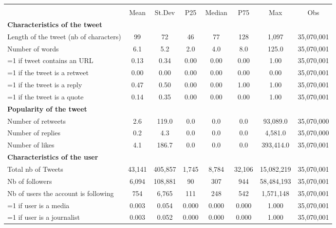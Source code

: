 {
\def\sym#1{\ifmmode^{#1}\else\(^{#1}\)\fi}
\begin{tabular}{l*{1}{ccccccc}}
\hline\hline
                    &\multicolumn{7}{c}{}                                                                      \\
                    &        Mean&      St.Dev&         P25&      Median&         P75&         Max&         Obs\\
\hline
\textbf{Characteristics of the tweet}&            &            &            &            &            &            &            \\
Length of the tweet (nb of characters)&          99&          72&          46&          77&         128&       1,097&  35,070,001\\
Number of words     &         6.1&         5.2&         2.0&         4.0&         8.0&       125.0&  35,070,001\\
=1 if tweet contains an URL&        0.13&        0.34&        0.00&        0.00&        0.00&        1.00&  35,070,001\\
=1 if the tweet is a retweet&        0.00&        0.00&        0.00&        0.00&        0.00&        0.00&  35,070,001\\
=1 if the tweet is a reply&        0.47&        0.50&        0.00&        0.00&        1.00&        1.00&  35,070,001\\
=1 if the tweet is a quote&        0.14&        0.35&        0.00&        0.00&        0.00&        1.00&  35,070,001\\
\textbf{Popularity of the tweet}&            &            &            &            &            &            &            \\
Number of retweets  &         2.6&       119.0&         0.0&         0.0&         0.0&    93,089.0&  35,070,000\\
Number of replies   &         0.2&         4.3&         0.0&         0.0&         0.0&     4,581.0&  35,070,000\\
Number of likes     &         4.1&       186.7&         0.0&         0.0&         0.0&   393,414.0&  35,070,001\\
\textbf{Characteristics of the user}&            &            &            &            &            &            &            \\
Total nb of Tweets  &      43,141&     405,857&       1,745&       8,784&      32,106&  15,082,219&  35,070,001\\
Nb of followers     &       6,094&     108,881&          90&         307&         944&  58,484,193&  35,070,001\\
Nb of users the account is following&         754&       6,765&         111&         248&         542&   1,571,148&  35,070,001\\
=1 if user is a media&       0.003&       0.054&       0.000&       0.000&       0.000&       1.000&  35,070,001\\
=1 if user is a journalist&       0.003&       0.052&       0.000&       0.000&       0.000&       1.000&  35,070,001\\
\hline\hline
\end{tabular}
}

